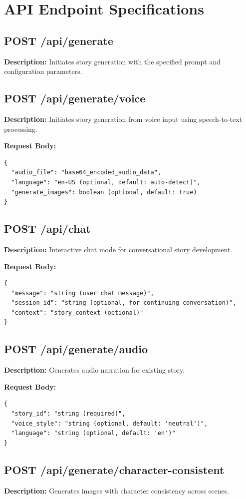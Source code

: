 \section{API Endpoint Specifications}

\subsection{POST /api/generate}
\textbf{Description:} Initiates story generation with the specified prompt and configuration parameters.

\subsection{POST /api/generate/voice}
\textbf{Description:} Initiates story generation from voice input using speech-to-text processing.

\textbf{Request Body:}
\begin{verbatim}
{
  "audio_file": "base64_encoded_audio_data",
  "language": "en-US (optional, default: auto-detect)",
  "generate_images": boolean (optional, default: true)
}
\end{verbatim}

\subsection{POST /api/chat}
\textbf{Description:} Interactive chat mode for conversational story development.

\textbf{Request Body:}
\begin{verbatim}
{
  "message": "string (user chat message)",
  "session_id": "string (optional, for continuing conversation)",
  "context": "story_context (optional)"
}
\end{verbatim}

\subsection{POST /api/generate/audio}
\textbf{Description:} Generates audio narration for existing story.

\textbf{Request Body:}
\begin{verbatim}
{
  "story_id": "string (required)",
  "voice_style": "string (optional, default: 'neutral')",
  "language": "string (optional, default: 'en')"
}
\end{verbatim}

\subsection{POST /api/generate/character-consistent}
\textbf{Description:} Generates images with character consistency across scenes.


